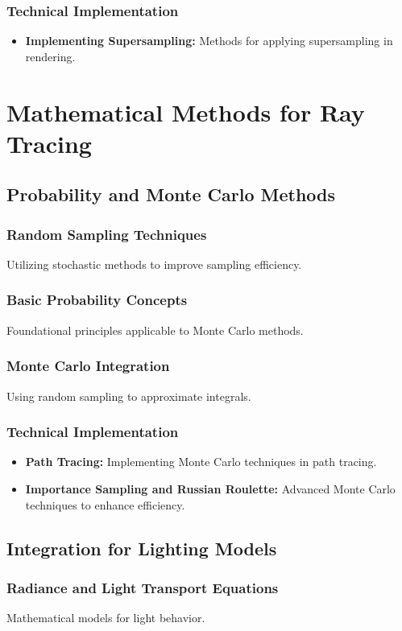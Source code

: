 \documentclass[12pt]{article}
\begin{document}
\subsubsection{Technical Implementation}
\begin{itemize}
    \item \textbf{Implementing Supersampling:} Methods for applying supersampling in rendering.
\end{itemize}

\section{Mathematical Methods for Ray Tracing}
\label{sec:math-methods}
\subsection{Probability and Monte Carlo Methods}
\subsubsection{Random Sampling Techniques}
Utilizing stochastic methods to improve sampling efficiency.
\subsubsection{Basic Probability Concepts}
Foundational principles applicable to Monte Carlo methods.
\subsubsection{Monte Carlo Integration}
Using random sampling to approximate integrals.
\subsubsection{Technical Implementation}
\begin{itemize}
    \item \textbf{Path Tracing:} Implementing Monte Carlo techniques in path tracing.
    \item \textbf{Importance Sampling and Russian Roulette:} Advanced Monte Carlo techniques to enhance efficiency.
\end{itemize}

\subsection{Integration for Lighting Models}
\subsubsection{Radiance and Light Transport Equations}
Mathematical models for light behavior.
\end{document}
